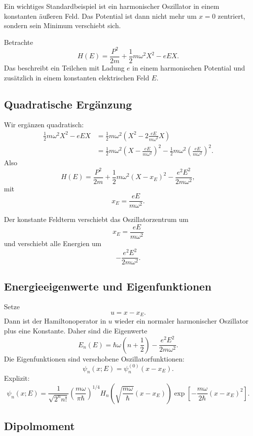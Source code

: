 Ein wichtiges Standardbeispiel ist ein harmonischer Oszillator in einem konstanten äußeren Feld. Das Potential ist dann nicht mehr um $x=0$ zentriert, sondern sein Minimum verschiebt sich.

Betrachte
\[
    H(E)=\frac{P^2}{2m}+\frac12m\omega^2X^2-eEX.
\]
Das beschreibt ein Teilchen mit Ladung $e$ in einem harmonischen Potential und zusätzlich in einem konstanten elektrischen Feld $E$.

\subsection{Quadratische Ergänzung}

Wir ergänzen quadratisch:
\begin{align*}
    \frac12m\omega^2X^2-eEX
    &=\frac12m\omega^2\left(X^2-2\frac{eE}{m\omega^2}X\right) \\
    &=\frac12m\omega^2\left(X-\frac{eE}{m\omega^2}\right)^2
      -\frac12m\omega^2\left(\frac{eE}{m\omega^2}\right)^2.
\end{align*}
Also
\[
    H(E)=\frac{P^2}{2m}+\frac12m\omega^2\left(X-x_E\right)^2
    -\frac{e^2E^2}{2m\omega^2},
\]
mit
\[
    x_E=\frac{eE}{m\omega^2}.
\]

\begin{formulabox}
Der konstante Feldterm verschiebt das Oszillatorzentrum um
\[
    x_E=\frac{eE}{m\omega^2}
\]
und verschiebt alle Energien um
\[
    -\frac{e^2E^2}{2m\omega^2}.
\]
\end{formulabox}

\subsection{Energieeigenwerte und Eigenfunktionen}

Setze
\[
    u=x-x_E.
\]
Dann ist der Hamiltonoperator in $u$ wieder ein normaler harmonischer Oszillator plus eine Konstante. Daher sind die Eigenwerte
\[
    E_n(E)=\hbar\omega\left(n+\frac12\right)-\frac{e^2E^2}{2m\omega^2}.
\]
Die Eigenfunktionen sind verschobene Oszillatorfunktionen:
\[
    \psi_n(x;E)=\psi_n^{(0)}(x-x_E).
\]
Explizit:
\[
    \psi_n(x;E)=\frac{1}{\sqrt{2^n n!}}
    \left(\frac{m\omega}{\pi\hbar}\right)^{1/4}
    H_n\left(\sqrt{\frac{m\omega}{\hbar}}(x-x_E)\right)
    \exp\left[-\frac{m\omega}{2\hbar}(x-x_E)^2\right].
\]

\subsection{Dipolmoment}

